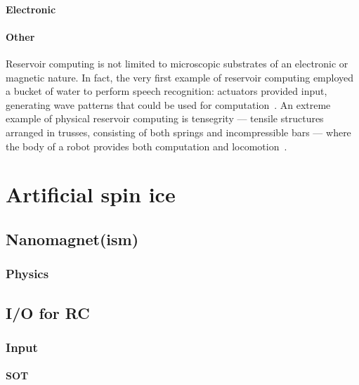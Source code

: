 \paragraph{Electronic}
\paragraph{Other}
Reservoir computing is not limited to microscopic substrates of an electronic or magnetic nature.
In fact, the very first example of reservoir computing employed a bucket of water to perform speech recognition: actuators provided input, generating wave patterns that could be used for computation~\cite{PatternRecognition_Bucket}.
An extreme example of physical reservoir computing is tensegrity --- tensile structures arranged in trusses, consisting of both springs and incompressible bars --- where the body of a robot provides both computation and locomotion~\cite{RC_Tensegrity}.

\section{Artificial spin ice}\label{sec:1:ASI} %
\subsection{Nanomagnet(ism)}
\subsubsection{Physics} %
\subsection{I/O for RC}\label{sec:1:ASI_IO}
\subsubsection{Input}
\paragraph{SOT}
\cite{SOT_FM_AFM,SOTswitchingCoPt,SOT_Roadmap,vlasov2022optimal}
